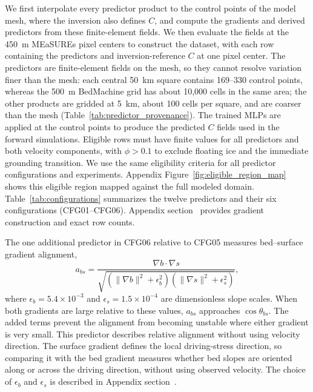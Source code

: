 \documentclass[review,jog]{igs}
\begin{document}
We first interpolate every predictor product to the control points of the model mesh, where the inversion also defines $C$, and compute the gradients and derived predictors from these finite-element fields. We then evaluate the fields at the 450~m MEaSUREs pixel centers to construct the dataset, with each row containing the predictors and inversion-reference $C$ at one pixel center. The predictors are finite-element fields on the mesh, so they cannot resolve variation finer than the mesh: each central 50~km square contains 169--330 control points, whereas the 500~m BedMachine grid has about 10,000 cells in the same area; the other products are gridded at 5~km, about 100 cells per square, and are coarser than the mesh (Table~\ref{tab:predictor_provenance}). The trained MLPs are applied at the control points to produce the predicted $C$ fields used in the forward simulations. Eligible rows must have finite values for all predictors and both velocity components, with $\phi>0.1$ to exclude floating ice and the immediate grounding transition. We use the same eligibility criteria for all predictor configurations and experiments. Appendix Figure~\ref{fig:eligible_region_map} shows this eligible region mapped against the full modeled domain. Table~\ref{tab:configurations} summarizes the twelve predictors and their six configurations (CFG01--CFG06). Appendix section~ provides gradient construction and exact row counts.
 
The one additional predictor in CFG06 relative to CFG05 measures bed--surface gradient alignment,
\begin{equation}
\label{eq:alignment}
a_{bs}=
\frac{\nabla b\cdot\nabla s}
{\sqrt{\left(\lVert\nabla b\rVert^2+\epsilon_b^2\right)
\left(\lVert\nabla s\rVert^2+\epsilon_s^2\right)}},
\end{equation}
where $\epsilon_b=5.4\times10^{-3}$ and
$\epsilon_s=1.5\times10^{-4}$ are dimensionless slope scales. When both gradients are large
relative to these values, $a_{bs}$ approaches $\cos\theta_{bs}$. The added terms prevent the alignment from becoming unstable where either gradient is very small. This predictor describes relative alignment
without using velocity direction. The surface gradient defines the local driving-stress direction, so comparing it with the bed gradient measures whether bed slopes are oriented along or across the driving direction, without using observed velocity. The choice of $\epsilon_b$ and $\epsilon_s$
is described in Appendix section~.
\end{document}
